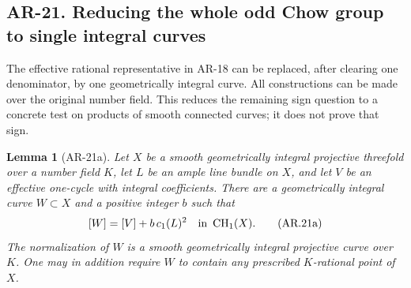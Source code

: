 \documentclass[11pt,a4paper]{article}
\newtheorem{lemma}[theorem]{Lemma}
\begin{document}
\subsection*{AR-21. Reducing the whole odd Chow group to single integral curves}

The effective rational representative in AR-18 can be replaced, after
clearing one denominator, by one geometrically integral curve.  All
constructions can be made over the original number field.  This reduces
the remaining sign question to a concrete test on products of smooth
connected curves; it does not prove that sign.

\begin{lemma}[AR-21a]
Let $X$ be a smooth geometrically integral projective threefold over a
number field $K$, let $L$ be an ample line bundle on $X$, and let $V$ be an
effective one-cycle with integral coefficients.  There are a
geometrically integral curve $W\subset X$ and a positive integer $b$ such
that
\[
 [W]=[V]+b\,c_1(L)^2\quad\hbox{in }\operatorname{CH}_1(X).
 \tag{AR.21a}
\]
The normalization of $W$ is a smooth geometrically integral projective
curve over $K$.  One may in addition require $W$ to contain any
prescribed $K$-rational point of $X$.
\end{lemma}
\end{document}
